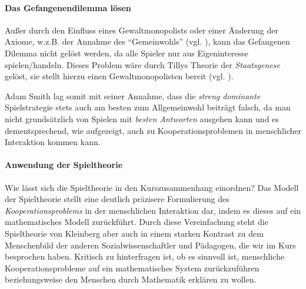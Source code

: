 \paragraph{Das Gefangenendilemma lösen}

Außer durch den Einfluss eines Gewaltmonopolists oder einer Änderung der Axiome, w.z.B. der Annahme des ``Gemeinwohls'' (vgl. \citeauthor{rousseau-1762}), kann das Gefangenen Dilemma nicht gelöst werden, da alle Spieler nur aus Eigeninteresse spielen/handeln.
Dieses Problem wäre durch Tillys Theorie der \emph{Staatsgenese} gelöst, sie stellt hierzu einen Gewaltmonopolisten bereit (vgl. \citeauthor{Tilly-1985-aa}).

Adam Smith lag somit mit seiner Annahme, dass die \emph{streng dominante} Spielstrategie stets auch am besten zum Allgemeinwohl beiträgt falsch, da man nicht grundsätzlich von Spielen mit \emph{besten Antworten} ausgehen kann und es dementsprechend, wie aufgezeigt, auch zu Kooperationsproblemen in menschlicher Interaktion kommen kann.


\paragraph{Anwendung der Spieltheorie}

Wie lässt sich die Spieltheorie in den Kurszusammenhang einordnen?
Das Modell der Spieltheorie stellt eine deutlich präzisere Formulierung des \emph{Kooperationsproblems} in der menschlichen Interaktion dar, indem es dieses auf ein mathematisches Modell zurückführt.
Durch diese Vereinfachung steht die Spieltheorie von Kleinberg aber auch in einem starken Kontrast zu dem Menschenbild der anderen Sozialwissenschaftler und Pädagogen, die wir im Kurs besprochen haben.
Kritisch zu hinterfragen ist, ob es sinnvoll ist, menschliche Kooperationsprobleme auf ein mathematisches System zurückzuführen beziehungsweise den Menschen durch Mathematik erklären zu wollen.
